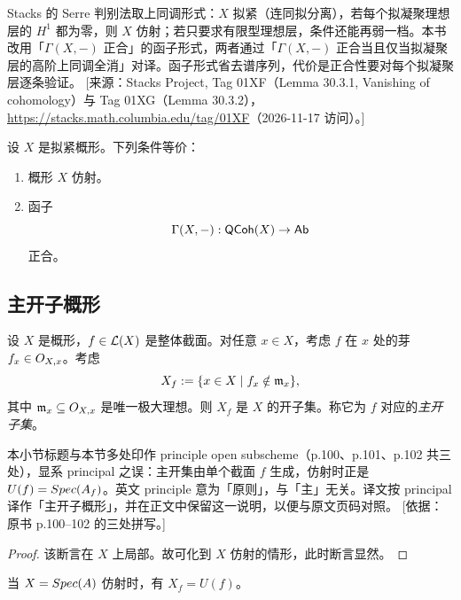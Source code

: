 \begin{yizhu}
Stacks 的 Serre 判别法取上同调形式：$X$ 拟紧（连同拟分离），若每个拟凝聚理想层的 $H^1$ 都为零，则 $X$ 仿射；若只要求有限型理想层，条件还能再弱一档。本书改用「$\Gamma(X,-)$ 正合」的函子形式，两者通过「$\Gamma(X,-)$ 正合当且仅当拟凝聚层的高阶上同调全消」对译。函子形式省去谱序列，代价是正合性要对每个拟凝聚层逐条验证。
[来源：Stacks Project, Tag 01XF（Lemma 30.3.1, Vanishing of cohomology）与 Tag 01XG（Lemma 30.3.2），\url{https://stacks.math.columbia.edu/tag/01XF}（2026-11-17 访问）。]
\end{yizhu}

\begin{theorem}[Serre]\label{thm:20.3.2}
设 $X$ 是拟紧概形。下列条件等价：
\begin{enumerate}[label=(\roman*),leftmargin=2em,itemsep=0.25ex]
  \item 概形 $X$ 仿射。
  \item 函子
  \[
  \Gamma(X,-):\mathsf{QCoh}(X)\to\mathsf{Ab}
  \]
  正合。
\end{enumerate}
\end{theorem}

\subsection{主开子概形}\label{sec:20.4}

\begin{propdef}\label{prop:20.4.1}
设 $X$ 是概形，$f\in\mathcal{L}(X)$ 是整体截面。对任意 $x\in X$，考虑 $f$ 在 $x$ 处的芽 $f_x\in O_{X,x}$。考虑
\[
X_f:=\{x\in X\mid f_x\notin\mathfrak{m}_x\},
\]
其中 $\mathfrak{m}_x\subseteq O_{X,x}$ 是唯一极大理想。则 $X_f$ 是 $X$ 的开子集。称它为 $f$ 对应的\emph{主开子集}。
\end{propdef}

\begin{yizhu}
本小节标题与本节多处印作 principle open subscheme（p.100、p.101、p.102 共三处），显系 principal 之误：主开集由单个截面 $f$ 生成，仿射时正是 $U(f)=Spec(A_f)$。英文 principle 意为「原则」，与「主」无关。译文按 principal 译作「主开子概形」，并在正文中保留这一说明，以便与原文页码对照。
[依据：原书 p.100–102 的三处拼写。]
\end{yizhu}

\begin{proof}
该断言在 $X$ 上局部。故可化到 $X$ 仿射的情形，此时断言显然。
\end{proof}

\begin{remark}\label{rem:20.4.2}
当 $X=Spec(A)$ 仿射时，有 $X_f=U(f)$。
\end{remark}

